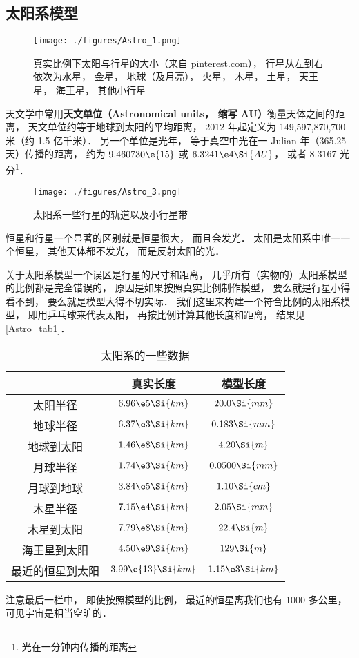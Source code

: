
\subsection{太阳系模型}

\begin{figure}[ht]
\centering
\texttt{[image: ./figures/Astro\_1.png]}
\caption{真实比例下太阳与行星的大小（来自 pinterest.com）， 行星从左到右依次为水星， 金星， 地球（及月亮）， 火星， 木星， 土星， 天王星， 海王星， 其他小行星} \label{Astro_fig1}
\end{figure}

天文学中常用\textbf{天文单位（Astronomical units， 缩写 AU）}衡量天体之间的距离， 天文单位约等于地球到太阳的平均距离， 2012 年起定义为 149,597,870,700 米（约 1.5 亿千米）． 另一个单位是光年， 等于真空中光在一 Julian 年（365.25 天）传播的距离， 约为 $9.460730\e{15}$ 或 $6.3241\e4\Si{AU}$， 或者 8.3167 光分\footnote{光在一分钟内传播的距离}．

\begin{figure}[ht]
\centering
\texttt{[image: ./figures/Astro\_3.png]}
\caption{太阳系一些行星的轨道以及小行星带} \label{Astro_fig3}
\end{figure}

恒星和行星一个显著的区别就是恒星很大， 而且会发光． 太阳是太阳系中唯一一个恒星， 其他天体都不发光， 而是反射太阳的光．

关于太阳系模型一个误区是行星的尺寸和距离， 几乎所有（实物的）太阳系模型的比例都是完全错误的， 原因是如果按照真实比例制作模型， 要么就是行星小得看不到， 要么就是模型大得不切实际． 我们这里来构建一个符合比例的太阳系模型， 即用乒乓球来代表太阳， 再按比例计算其他长度和距离， 结果见\autoref{Astro_tab1}．

\begin{table}[ht]
\centering
\caption{太阳系的一些数据}\label{Astro_tab1}
\begin{tabular}{|c|c|c|}
\hline
 & 真实长度 & 模型长度 \\
\hline
太阳半径 & $6.96\e5 \Si{km}$ & $20.0 \Si{mm}$\\
\hline
地球半径 &  $6.37\e3 \Si{km}$ & $0.183 \Si{mm}$\\
\hline
地球到太阳  &  $1.46\e8 \Si{km}$ & $4.20 \Si{m}$\\
\hline
月球半径 & $1.74\e3 \Si{km}$ & $0.0500 \Si{mm}$\\
\hline
月球到地球 & $3.84\e5 \Si{km}$ &  $1.10 \Si{cm}$\\
\hline
木星半径 & $7.15\e4 \Si{km}$ & $2.05 \Si{mm}$\\
\hline
木星到太阳 & $7.79\e8 \Si{km}$ & $22.4 \Si{m}$\\
\hline
海王星到太阳 & $4.50\e9 \Si{km}$ & $129 \Si{m}$\\
\hline
最近的恒星到太阳 & $3.99\e{13} \Si{km}$ &  $1.15\e3 \Si{km}$\\
\hline
\end{tabular}
\end{table}
注意最后一栏中， 即使按照模型的比例， 最近的恒星离我们也有 1000 多公里， 可见宇宙是相当空旷的．

